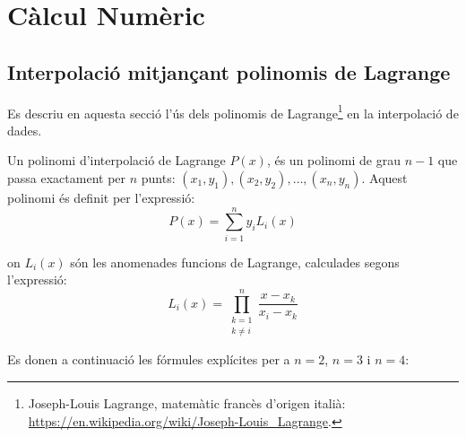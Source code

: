 
\chapter{Càlcul Numèric}\label{sec:ch-calc-num}

\section{Interpolació mitjançant polinomis de Lagrange}
\label{sec:poli_lagr}

Es descriu en aquesta secció l'ús dels polinomis de Lagrange\footnote{Joseph-Louis Lagrange, matemàtic francès d'origen italià: \href{https://en.wikipedia.org/wiki/Joseph-Louis_Lagrange}{https:/\!\!/en.wikipedia.org/wiki/Joseph-Louis\_Lagrange}.}  en la interpolació de dades.

Un polinomi d'interpolació de Lagrange $P(x)$, és un polinomi de grau $n-1$ que passa exactament per $n$ punts:
$(x_1, y_1), (x_2, y_2), \dots, (x_n, y_n)$. Aquest polinomi és definit per l'expressió:
\begin{equation}
  P(x) = \sum_{i=1}^{n}  y_i L_i(x) \label{eq:poly_lag_1}
\end{equation}

on $L_i(x)$ són les anomenades funcions de Lagrange, calculades segons l'expressió:
\begin{equation}
  L_i(x) = \prod_{\substack{k=1 \\ k\neq i}}^{n} \frac{x-x_k}{x_i-x_k} \label{eq:poly_lag_2}
\end{equation}

Es donen a continuació les fórmules explícites per a $n = 2$, $n=3$ i $n=4$:

